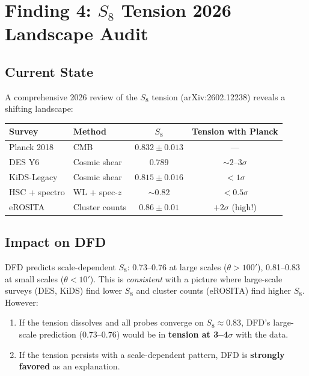\documentclass[11pt]{article}
\begin{document}
\section{Finding 4: $S_8$ Tension 2026 Landscape Audit}
\label{sec:S8}

\subsection{Current State}

A comprehensive 2026 review of the $S_8$ tension (arXiv:2602.12238)
reveals a shifting landscape:

\begin{center}
\begin{tabular}{llcc}
\toprule
\textbf{Survey} & \textbf{Method} & $S_8$ & \textbf{Tension with
Planck} \\
\midrule
Planck 2018 & CMB & $0.832 \pm 0.013$ & --- \\
DES Y6 & Cosmic shear & $0.789$ & $\sim 2$--$3\sigma$ \\
KiDS-Legacy & Cosmic shear & $0.815 \pm 0.016$ & $< 1\sigma$ \\
HSC + spectro & WL + spec-$z$ & $\sim 0.82$ & $< 0.5\sigma$ \\
eROSITA & Cluster counts & $0.86 \pm 0.01$ & $+2\sigma$ (high!) \\
\bottomrule
\end{tabular}
\end{center}

\subsection{Impact on DFD}

DFD predicts scale-dependent $S_8$: 0.73--0.76 at large scales
($\theta > 100'$), 0.81--0.83 at small scales ($\theta < 10'$).  This
is \emph{consistent} with a picture where large-scale surveys
(DES, KiDS) find lower $S_8$ and cluster counts (eROSITA) find higher
$S_8$.  However:

\begin{enumerate}[nosep]
\item If the tension dissolves and all probes converge on $S_8 \approx
  0.83$, DFD's large-scale prediction (0.73--0.76) would be in
  \textbf{tension at 3--4$\sigma$} with the data.
\item If the tension persists with a scale-dependent pattern, DFD is
  \textbf{strongly favored} as an explanation.
\end{enumerate}
\end{document}
